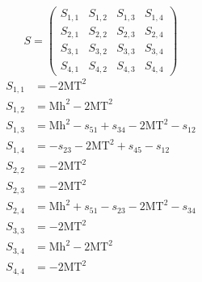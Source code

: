 \documentclass[a4paper]{article}
\begin{document}
\begin{equation}
S=\left(\begin{array}{cccc}
   S_{1,1}&
   S_{1,2}&
   S_{1,3}&
   S_{1,4}\\
   S_{2,1}&
   S_{2,2}&
   S_{2,3}&
   S_{2,4}\\
   S_{3,1}&
   S_{3,2}&
   S_{3,3}&
   S_{3,4}\\
   S_{4,1}&
   S_{4,2}&
   S_{4,3}&
   S_{4,4}\end{array}\right)
\end{equation}
\begin{subequations}
\begin{align}
   S_{1,1}&=-2\text{MT}^2\\
   S_{1,2}&=\text{Mh}^2-2\text{MT}^2\\
   S_{1,3}&=\text{Mh}^2-s_{51}+s_{34}-2\text{MT}^2-s_{12}\\
   S_{1,4}&=-s_{23}-2\text{MT}^2+s_{45}-s_{12}\\
   S_{2,2}&=-2\text{MT}^2\\
   S_{2,3}&=-2\text{MT}^2\\
   S_{2,4}&=\text{Mh}^2+s_{51}-s_{23}-2\text{MT}^2-s_{34}\\
   S_{3,3}&=-2\text{MT}^2\\
   S_{3,4}&=\text{Mh}^2-2\text{MT}^2\\
   S_{4,4}&=-2\text{MT}^2
\end{align}
\end{subequations}
\end{document}
